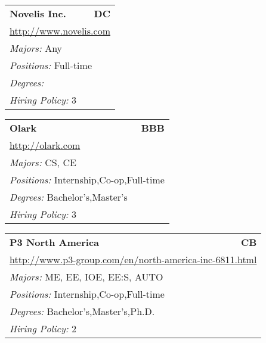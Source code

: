 \documentclass[twoside]{article}
\begin{document}
\begin{center}
\begin{multicols}{3}
\begin{FlushLeft}
\begin{minipage}{.9\columnwidth}
\end{minipage}
 
\begin{minipage}{.9\columnwidth}\begin{tabularx}{.95\columnwidth}{Xr}
                 {\Large\bf Novelis Inc.} & {\Large\bf DC}\\
    \multicolumn{2}{p{.95\columnwidth}}{\url{http://www.novelis.com}}\\
    \multicolumn{2}{p{.95\columnwidth}}{\emph{Majors:} Any}\\
    \multicolumn{2}{p{.95\columnwidth}}{\emph{Positions:} Full-time}\\
    \multicolumn{2}{p{.95\columnwidth}}{\emph{Degrees:} }\\
    \multicolumn{2}{p{.95\columnwidth}}{\emph{Hiring Policy:} 3}\\
    \end{tabularx}
    
\end{minipage}
 
\begin{minipage}{.9\columnwidth}\begin{tabularx}{.95\columnwidth}{Xr}
                 {\Large\bf Olark} & {\Large\bf BBB}\\
    \multicolumn{2}{p{.95\columnwidth}}{\url{http://olark.com}}\\
    \multicolumn{2}{p{.95\columnwidth}}{\emph{Majors:} CS, CE}\\
    \multicolumn{2}{p{.95\columnwidth}}{\emph{Positions:} Internship,Co-op,Full-time}\\
    \multicolumn{2}{p{.95\columnwidth}}{\emph{Degrees:} Bachelor's,Master's}\\
    \multicolumn{2}{p{.95\columnwidth}}{\emph{Hiring Policy:} 3}\\
    \end{tabularx}
    
\end{minipage}
 
\begin{minipage}{.9\columnwidth}\begin{tabularx}{.95\columnwidth}{Xr}
                 {\Large\bf P3 North America} & {\Large\bf CB}\\
    \multicolumn{2}{p{.95\columnwidth}}{\url{http://www.p3-group.com/en/north-america-inc-6811.html}}\\
    \multicolumn{2}{p{.95\columnwidth}}{\emph{Majors:} ME, EE, IOE, EE:S, AUTO}\\
    \multicolumn{2}{p{.95\columnwidth}}{\emph{Positions:} Internship,Co-op,Full-time}\\
    \multicolumn{2}{p{.95\columnwidth}}{\emph{Degrees:} Bachelor's,Master's,Ph.D.}\\
    \multicolumn{2}{p{.95\columnwidth}}{\emph{Hiring Policy:} 2}\\
    \end{tabularx}
    

\end{minipage}
\end{FlushLeft}
\end{multicols}
\end{center}
\end{document}
